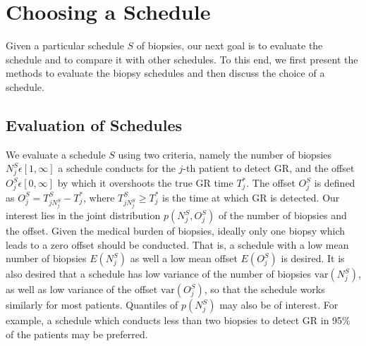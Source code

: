 
\section{Choosing a Schedule}
\label{sec : choosing_schedule}
Given a particular schedule $S$ of biopsies, our next goal is to evaluate the schedule and to compare it with other schedules. To this end, we first present the methods to evaluate the biopsy schedules and then discuss the choice of a schedule.

\subsection{Evaluation of Schedules}
We evaluate a schedule $S$ using two criteria, namely the number of biopsies $N^S_j \epsilon [1, \infty]$ a schedule conducts for the $j$-th patient to detect GR, and the offset $O^S_j \epsilon [0, \infty]$ by which it overshoots the true GR time $T^*_j$. The offset $O^S_j$ is defined as $O^S_j = T^S_{j{N^S_j}} - T^*_j$, where $T^S_{j{N^S_j}} \geq T^*_j$ is the time at which GR is detected. Our interest lies in the joint distribution $p(N^S_j, O^S_j)$ of the number of biopsies and the offset. Given the medical burden of biopsies, ideally only one biopsy which leads to a zero offset should be conducted. That is, a schedule with a low mean number of biopsies $E(N^S_j)$ as well a low mean offset $E(O^S_j)$ is desired. It is also desired that a schedule has low variance of the number of biopsies $\mbox{var}(N^S_j)$, as well as low variance of the offset $\mbox{var}(O^S_j)$, so that the schedule works similarly for most patients. Quantiles of $p(N^S_j)$ may also be of interest. For example, a schedule which conducts less than two biopsies to detect GR in 95\% of the patients may be preferred.

